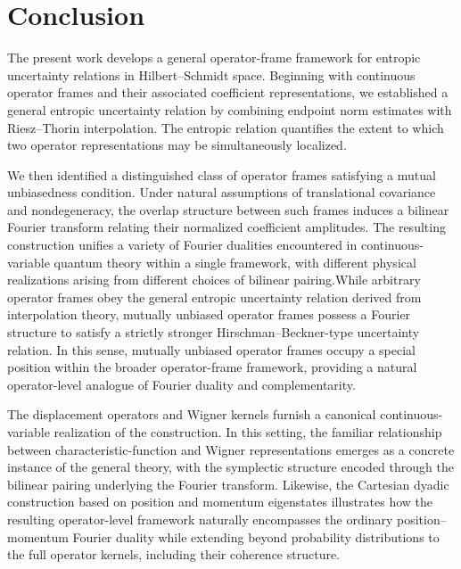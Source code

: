 \documentclass[aps,pra,onecolumn,nofootinbib,superscriptaddress,showpacs]{revtex4}
\begin{document}


\section{Conclusion}
\noindent The present work develops a general operator-frame framework for entropic uncertainty relations in Hilbert--Schmidt space. Beginning with continuous operator frames and their associated coefficient representations, we established a general entropic uncertainty relation by combining endpoint norm estimates with Riesz--Thorin interpolation. The entropic relation quantifies the extent to which two operator representations may be simultaneously localized.


We then identified a distinguished class of operator frames satisfying a mutual unbiasedness condition. 
Under natural assumptions of translational covariance and
nondegeneracy, the overlap structure between such frames induces a
bilinear Fourier transform relating their normalized coefficient
amplitudes. The resulting construction unifies a variety of Fourier
dualities encountered in continuous-variable quantum theory within a single framework, with different physical realizations arising from different choices of bilinear pairing.While arbitrary operator frames obey the general entropic uncertainty relation derived from interpolation theory, mutually unbiased operator frames possess a Fourier structure to satisfy a strictly stronger Hirschman--Beckner-type uncertainty relation. In this sense, mutually unbiased operator frames occupy a special position within the broader operator-frame framework, providing a natural operator-level analogue of Fourier duality and complementarity.

The displacement operators and Wigner kernels furnish a canonical continuous-variable realization of the construction. In this setting, the familiar relationship between characteristic-function and Wigner representations emerges as a concrete instance of the general theory, with the symplectic structure encoded through the bilinear pairing underlying the Fourier transform. Likewise, the Cartesian dyadic construction based on position and momentum eigenstates illustrates how the resulting operator-level framework naturally encompasses the ordinary position--momentum Fourier duality while extending beyond probability distributions to the full operator kernels, including their coherence structure.
\end{document}
